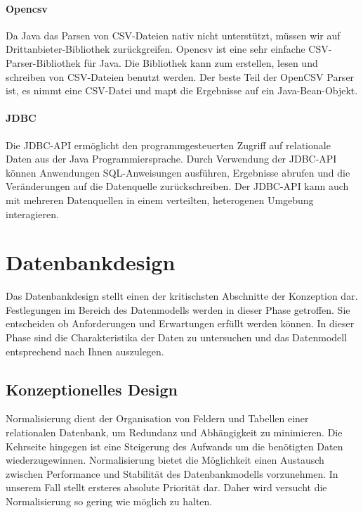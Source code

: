 \paragraph{Opencsv}

Da Java das Parsen von CSV-Dateien nativ nicht unterstützt, müssen wir auf Drittanbieter-Bibliothek zurückgreifen. Opencsv ist eine sehr einfache CSV-Parser-Bibliothek für Java. Die Bibliothek kann zum erstellen, lesen und schreiben von CSV-Dateien benutzt werden. Der beste Teil der OpenCSV Parser ist, es nimmt eine CSV-Datei und mapt die Ergebnisse auf ein Java-Bean-Objekt.

\paragraph{JDBC}

Die JDBC-API ermöglicht den programmgesteuerten Zugriff auf relationale Daten aus der Java Programmiersprache. Durch Verwendung der JDBC-API können Anwendungen SQL-Anweisungen ausführen, Ergebnisse abrufen und die Veränderungen auf die Datenquelle zurückschreiben. Der JDBC-API kann auch mit mehreren Datenquellen in einem verteilten, heterogenen Umgebung interagieren. 

\section{Datenbankdesign}

Das Datenbankdesign stellt einen der kritischsten Abschnitte der Konzeption dar. Festlegungen im Bereich des Datenmodells werden in dieser Phase getroffen. Sie entscheiden ob Anforderungen und Erwartungen erfüllt werden können. In dieser Phase sind die Charakteristika der Daten zu untersuchen und das Datenmodell entsprechend nach Ihnen auszulegen.

\subsection{Konzeptionelles Design}

Normalisierung dient der Organisation von Feldern und Tabellen einer relationalen Datenbank, um Redundanz und Abhängigkeit zu minimieren. Die Kehrseite hingegen ist eine Steigerung des Aufwands um die benötigten Daten wiederzugewinnen. Normalisierung bietet die Möglichkeit einen Austausch zwischen Performance und Stabilität des Datenbankmodells vorzunehmen. 
In unserem Fall stellt ersteres absolute Priorität dar. Daher wird versucht die Normalisierung so gering wie möglich zu halten. 

